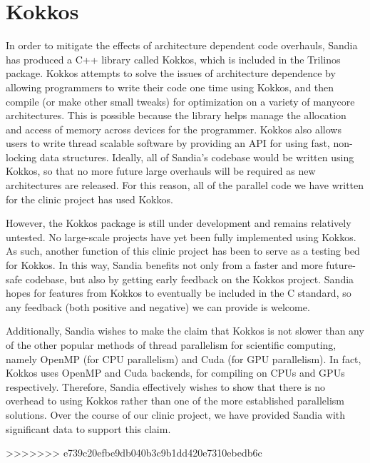\section{Kokkos}

In order to mitigate the effects of architecture dependent code overhauls, Sandia has produced a C++ library called
Kokkos, which is included in the Trilinos package. Kokkos attempts to solve the issues of architecture dependence 
by allowing programmers to write their code one time using Kokkos, and then compile (or make other small tweaks) 
for optimization on a variety of manycore architectures.
This is possible because the library helps manage the allocation and access of memory across devices for the
programmer. Kokkos also allows users to write thread scalable software by providing an API for
using fast, non-locking data structures. Ideally, all of Sandia's codebase would be written using Kokkos, so that 
no more future large overhauls will be required as new architectures are released. For this reason, all of 
the parallel code we have written for the clinic project has used Kokkos.

However, the Kokkos package is still under development and remains relatively untested. No
large-scale projects have yet been fully implemented using Kokkos. As such, another function of this clinic project 
has been to serve as a testing bed for Kokkos. 
In this way, Sandia benefits not only from a faster and more future-safe codebase, but also by getting early feedback 
on the Kokkos project. Sandia hopes for features from Kokkos to eventually be included in the C standard,
so any feedback (both positive and negative) we can provide is welcome. 

Additionally, Sandia wishes to 
make the claim that Kokkos is not slower than any of the other popular methods of thread parallelism for scientific
computing, namely OpenMP (for CPU parallelism) and Cuda (for GPU parallelism). In fact, Kokkos uses OpenMP and Cuda 
backends, for compiling on CPUs and GPUs respectively. Therefore, Sandia effectively wishes to show that there is 
no overhead to using Kokkos rather than one of the more established parallelism solutions. Over the course of our clinic
project, we have provided Sandia with significant data to support this claim.

>>>>>>> e739c20efbe9db040b3c9b1dd420e7310ebedb6c










